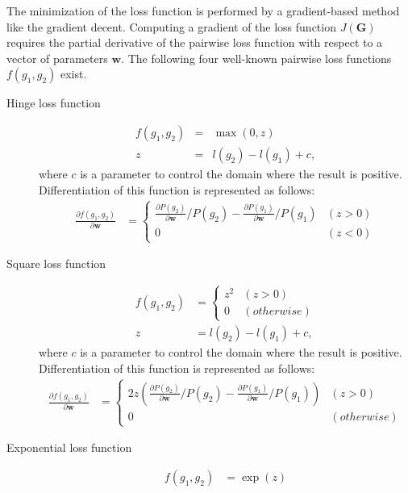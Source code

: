 \documentclass[a4paper]{report}
\newcommand{\bvec}[1]{\boldsymbol{#1}}
\newcommand{\vw}{\bvec{w}}
\newcommand{\vG}{\bvec{G}}
\begin{document}
The minimization of the loss function is performed by a gradient-based method like the gradient decent.
Computing a gradient of the loss function $J(\vG)$ requires the partial derivative of the pairwise loss function with respect to a vector of parameters $\vw$.
The following four well-known pairwise loss functions $f(g_1, g_2)$ exist.

\begin{description}
	\item[Hinge loss function] 
	\begin{eqnarray}
	f(g_1,g_2) &=&  \max \left(0 ,z \right) \nonumber \\
	z&=&l(g_2)-l(g_1) + c, \label{eq:rank_loss_h}
	\end{eqnarray}
	where $c$ is a parameter to control the domain where the result is positive.
	Differentiation of this function is represented as follows:
	\begin{align}
	\frac{\partial f(g_1,g_2)}{\partial \vw} &=  \begin{cases}
	\frac{\partial P(g_2)}{\partial \vw}/P(g_2)-\frac{\partial P(g_1)}{\partial \vw}/P(g_1)  & (z > 0) \nonumber \\
	0 & (z< 0) 
	\end{cases}
	\end{align}
	\item[Square loss function] 
	\begin{align}
	f(g_1,g_2) &= \begin{cases}
	z^2 & (z > 0) \nonumber \\
	0 & (otherwise)
	\end{cases} \nonumber \\
	z&=l(g_2)-l(g_1) + c, \label{eq:rank_loss_sq}
	\end{align}
	where $c$ is a parameter to control the domain where the result is positive.
	Differentiation of this function is represented as follows:
	\begin{align}
	\frac{\partial f(g_1,g_2)}{\partial \vw} &=  \begin{cases}
	2 z \left( \frac{\partial P(g_2)}{\partial \vw}/P(g_2)-\frac{\partial P(g_1)}{\partial \vw}/P(g_1) \right)  & (z > 0) \nonumber \\
	0 & (otherwise)
	\end{cases}
	\end{align}
	\item[Exponential loss function] 
	\begin{align}
	f(g_1,g_2) &= \exp(z) \nonumber \\

\end{align}
\end{description}
\end{document}
